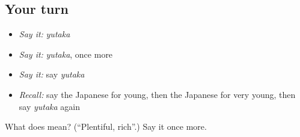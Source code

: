 \subsection*{Your turn}
\begin{itemize}
\raggedright
  \item \emph{Say it:} \emph{yutaka}
  \item \emph{Say it:} \emph{yutaka}, once more
  \item \emph{Say it:} say \emph{yutaka}
  \item \emph{Recall:} say the Japanese for young, then the Japanese for very young, then say \emph{yutaka} again
\end{itemize}

\begin{tcolorbox}[breakable,colback=teal!4,colframe=teal!35!black,title={Before you move on}]
What does  mean? (\textquotedblleft{}Plentiful, rich\textquotedblright{}.) Say it once more.
\end{tcolorbox}

